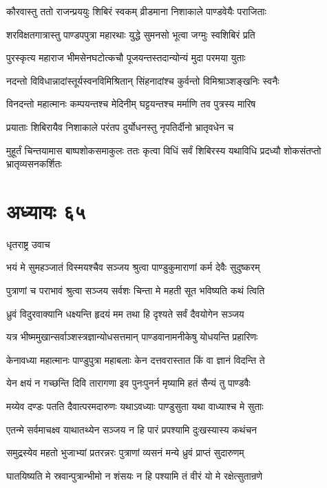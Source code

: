 \twolineshloka
{कौरवास्तु ततो राजन्प्रययुः शिबिरं स्वकम्}
{व्रीडमाना निशाकाले पाण्डवेयैः पराजिताः}


\twolineshloka
{शरविक्षतगात्रास्तु पाण्डपपुत्रा महारथाः}
{युद्धे सुमनसो भूत्वा जग्मुः स्वशिबिरं प्रति}


\twolineshloka
{पुरस्कृत्य महाराज भीमसेनघटोत्कचौ}
{पूजयन्तस्तदान्योन्यं मुदा परमया युताः}


\twolineshloka
{नदन्तो विविधान्नादांस्तूर्यस्वनविमिश्रितान्}
{सिंहनादांश्च कुर्वन्तो विमिश्राञ्शङ्खनिः स्वनैः}


\threelineshloka
{विनदन्तो महात्मानः कम्पयन्तश्च मेदिनीम्}
{घट्टयन्तश्च मर्माणि तव पुत्रस्य मारिष}
{}


\twolineshloka
{प्रयाताः शिबिरायैव निशाकाले परंतप}
{दुर्योधनस्तु नृपतिर्दीनो भ्रातृवधेन च}


\threelineshloka
{मुहूर्तं चिन्तयामास बाष्पशोकसमाकुलः}
{ततः कृत्वा विधिं सर्वं शिबिरस्य यथाविधि}
{प्रदध्यौ शोकसंतप्तो भ्रातृव्यसनकर्शितः}


\chapter{अध्यायः ६५}
\twolineshloka
{धृतराष्ट्र उवाच}
{}


\twolineshloka
{भयं मे सुमहञ्जातं विस्मयश्चैव सञ्जय}
{श्रुत्वा पाण्डुकुमाराणां कर्म देवैः सुदुष्करम्}


\twolineshloka
{पुत्राणां च पराभावं श्रुत्वा सञ्जय सर्वशः}
{चिन्ता मे महती सूत भविष्यति कथं त्विति}


\twolineshloka
{ध्रुवं विदुरवाक्यानि धक्ष्यन्ति हृदयं मम}
{तथा हि दृश्यते सर्वं दैवयोगेन सञ्जय}


\twolineshloka
{यत्र भीष्ममुखान्सर्वाञ्शस्त्रज्ञान्योधसत्तमान्}
{पाण्डवानामनीकेषु योधयन्ति प्रहारिणः}


\twolineshloka
{केनावध्या महात्मानः पाण्डुपुत्रा महाबलाः}
{केन दत्तवरास्तात किं वा ज्ञानं विदन्ति ते}


\twolineshloka
{येन क्षयं न गच्छन्ति दिवि तारागणा इव}
{पुनःपुनर्न मृष्यामि हतं सैन्यं तु पाण्डवैः}


\twolineshloka
{मय्येव दण्डः पतति दैवात्परमदारुणः}
{यथाऽवध्याः पाण्डुसुता यथा वाध्याश्च मे सुताः}


\twolineshloka
{एतन्मे सर्वमाचक्ष्व याथातथ्येन सञ्जय}
{न हि पारं प्रपश्यामि दुःखस्यास्य कथंचन}


\twolineshloka
{समुद्रस्येव महतो भुजाभ्यां प्रतरन्नरः}
{पुत्राणां व्यसनं मन्ये ध्रुवं प्राप्तं सुदारुणम्}


\twolineshloka
{घातयिष्यति मे स्रवान्पुत्रान्भीमो न शंसयः}
{न हि पश्यामि तं वीरं यो मे रक्षेत्सुतान्रणे}


